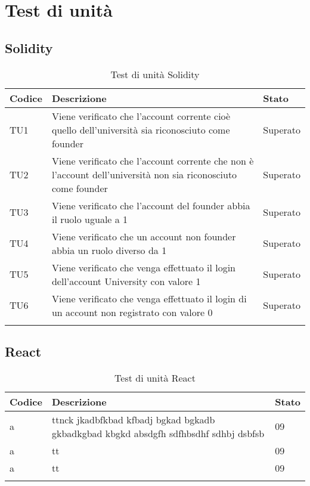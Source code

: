\documentclass[PianoDiQualifica.tex]{subfiles}
\begin{document}
\chapter{Test di unità}
\section{Solidity}
\begin{longtable}[H]{P{2cm}P{8.5cm}P{3cm}}
	\color{CHeaderText}\textbf{Codice} & 
	\color{CHeaderText}\textbf{Descrizione} & 
	\color{CHeaderText}\textbf{Stato}\\
	\endhead
	TU1 & Viene verificato che l'account corrente cioè quello dell'università sia riconosciuto come founder & Superato \\ 
	TU2 & Viene verificato che l'account corrente che non è l'account dell'università non sia riconosciuto come founder & Superato \\
	TU3 & Viene verificato che l'account del founder abbia il ruolo uguale a 1 & Superato \\
	TU4 & Viene verificato che un account non founder abbia un ruolo diverso da 1 & Superato \\
	TU5 & Viene verificato che venga effettuato il login dell'account University con valore 1 & Superato \\
	TU6 & Viene verificato che venga effettuato il login di un account non registrato con valore 0 & Superato \\
	\hiderowcolors
	\caption{Test di unità Solidity}
\end{longtable}

\section{React}
\begin{longtable}[H]{P{2cm}P{8.5cm}P{3cm}}
	\color{CHeaderText}\textbf{Codice} & 
	\color{CHeaderText}\textbf{Descrizione} & 
	\color{CHeaderText}\textbf{Stato}\\
	\endhead
	a & ttnck  jkadbfkbad kfbadj bgkad bgkadb gkbadkgbad kbgkd absdgfh sdfhbsdhf sdhbj dsbfsb & 09 \\ 
	a & tt & 09 \\
	a & tt & 09 \\
	\hiderowcolors
	\caption{Test di unità React}
\end{longtable}
\end{document}
